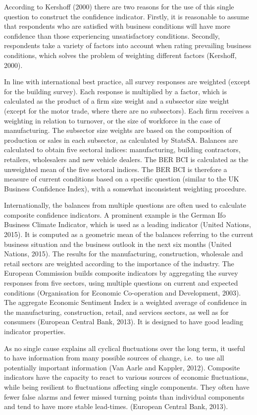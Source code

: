 \documentclass[11pt,]{article}
\begin{document}
According to Kershoff (2000) there are two reasons for the use of this
single question to construct the confidence indicator. Firstly, it is
reasonable to assume that respondents who are satisfied with business
conditions will have more confidence than those experiencing
unsatisfactory conditions. Secondly, respondents take a variety of
factors into account when rating prevailing business conditions, which
solves the problem of weighting different factors (Kershoff, 2000).

In line with international best practice, all survey responses are
weighted (except for the building survey). Each response is multiplied
by a factor, which is calculated as the product of a firm size weight
and a subsector size weight (except for the motor trade, where there are
no subsectors). Each firm receives a weighting in relation to turnover,
or the size of workforce in the case of manufacturing. The subsector
size weights are based on the composition of production or sales in each
subsector, as calculated by StatsSA. Balances are calculated to obtain
five sectoral indices: manufacturing, building contractors, retailers,
wholesalers and new vehicle dealers. The BER BCI is calculated as the
unweighted mean of the five sectoral indices. The BER BCI is therefore a
measure of current conditions based on a specific question (similar to
the UK Business Confidence Index), with a somewhat inconsistent
weighting procedure.

Internationally, the balances from multiple questions are often used to
calculate composite confidence indicators. A prominent example is the
German Ifo Business Climate Indicator, which is used as a leading
indicator (United Nations, 2015). It is computed as a geometric mean of
the balances referring to the current business situation and the
business outlook in the next six months (United Nations, 2015). The
results for the manufacturing, construction, wholesale and retail
sectors are weighted according to the importance of the industry. The
European Commission builds composite indicators by aggregating the
survey responses from five sectors, using multiple questions on current
and expected conditions (Organisation for Economic Co-operation and
Development, 2003). The aggregate Economic Sentiment Index is a weighted
average of confidence in the manufacturing, construction, retail, and
services sectors, as well as for consumers (European Central Bank,
2013). It is designed to have good leading indicator properties.

As no single cause explains all cyclical fluctuations over the long
term, it useful to have information from many possible sources of
change, i.e.~to use all potentially important information (Van Aarle and
Kappler, 2012). Composite indicators have the capacity to react to
various sources of economic fluctuations, while being resilient to
fluctuations affecting single components. They often have fewer false
alarms and fewer missed turning points than individual components and
tend to have more stable lead-times. (European Central Bank, 2013).
\end{document}
